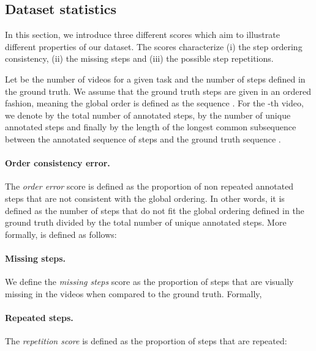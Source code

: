 \documentclass[10pt,twocolumn,letterpaper]{article}
\begin{document}
\subsection{Dataset statistics}
\label{subsec:score_dataset}

In this section, we introduce three different scores which aim to illustrate different properties of our dataset.
The scores characterize (i) the step ordering consistency, (ii) the missing steps and (iii) the possible step repetitions.
 
Let  be the number of videos for a given task and  the number of steps defined in the ground truth.
We assume that the ground truth steps are given in an ordered fashion, meaning the global order is defined as the sequence . 
For the -th video, we denote by  the total number of annotated steps, by  the number of unique annotated steps and finally by  the length of the longest common subsequence between the annotated sequence of steps and the ground truth sequence .

\paragraph{Order consistency error.}
The \emph{order error} score  is defined as the proportion of non repeated annotated steps that are not consistent with the global ordering.
In other words, it is defined as the number of steps that do not fit the global ordering defined in the ground truth divided by the total number of unique annotated steps.
More formally,  is defined as follows:


\paragraph{Missing steps.} 
We define the \emph{missing steps} score  as the proportion of steps that are visually missing in the videos when compared to the ground truth.
Formally, 


\paragraph{Repeated steps.}
The \emph{repetition score}  is defined as the proportion of steps that are repeated:
\end{document}
